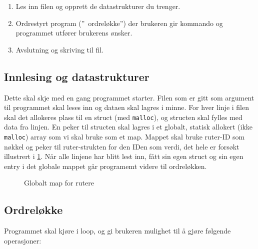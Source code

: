 \documentclass[norsk]{article}
\begin{document}
\begin{enumerate}
    \item Les inn filen og opprett de datastrukturer du trenger.
    \item Ordrestyrt program (\textquotedblright~ordreløkke\textquotedblright) der brukeren gir kommando og programmet utfører brukerens ønsker.
    \item Avslutning og skriving til fil.
\end{enumerate}

\subsection*{Innlesing og datastrukturer}
Dette skal skje med en gang programmet starter. Filen som er gitt som argument til programmet skal leses inn og dataen skal lagres i minne. For hver linje i filen skal det allokeres plass til en struct (med \texttt{malloc}), og structen skal fylles med data fra linjen. En peker til structen skal lagres i et globalt, statisk allokert (ikke \texttt{malloc}) array som vi skal bruke som et map. Mappet skal bruke ruter-ID som nøkkel og peker til ruter-strukten for den IDen som verdi, det hele er forsøkt illustrert i \cref{fig:map}. Når alle linjene har blitt lest inn, fått sin egen struct og sin egen entry i det globale mappet går programemt videre til ordreløkken.


\begin{figure}
    \centering
    \caption{Globalt map for rutere}\label{fig:map}
\end{figure}

\subsection*{Ordreløkke}
Programmet skal kjøre i loop, og gi brukeren mulighet til å gjøre følgende operasjoner:
\end{document}
